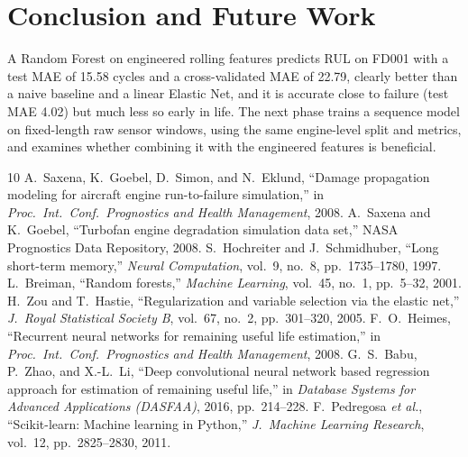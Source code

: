 \documentclass[conference]{IEEEtran}
\begin{document}
\section{Conclusion and Future Work}
A Random Forest on engineered rolling features predicts RUL on FD001 with a test MAE of 15.58 cycles and a cross-validated MAE of 22.79, clearly better than a naive baseline and a linear Elastic Net, and it is accurate close to failure (test MAE 4.02) but much less so early in life. The next phase trains a sequence model on fixed-length raw sensor windows, using the same engine-level split and metrics, and examines whether combining it with the engineered features is beneficial.

\begin{thebibliography}{10}
 A.~Saxena, K.~Goebel, D.~Simon, and N.~Eklund, ``Damage propagation modeling for aircraft engine run-to-failure simulation,'' in \emph{Proc.\ Int.\ Conf.\ Prognostics and Health Management}, 2008.
 A.~Saxena and K.~Goebel, ``Turbofan engine degradation simulation data set,'' NASA Prognostics Data Repository, 2008.
 S.~Hochreiter and J.~Schmidhuber, ``Long short-term memory,'' \emph{Neural Computation}, vol.~9, no.~8, pp.~1735--1780, 1997.
 L.~Breiman, ``Random forests,'' \emph{Machine Learning}, vol.~45, no.~1, pp.~5--32, 2001.
 H.~Zou and T.~Hastie, ``Regularization and variable selection via the elastic net,'' \emph{J.\ Royal Statistical Society B}, vol.~67, no.~2, pp.~301--320, 2005.
 F.~O.~Heimes, ``Recurrent neural networks for remaining useful life estimation,'' in \emph{Proc.\ Int.\ Conf.\ Prognostics and Health Management}, 2008.
 G.~S.~Babu, P.~Zhao, and X.-L.~Li, ``Deep convolutional neural network based regression approach for estimation of remaining useful life,'' in \emph{Database Systems for Advanced Applications (DASFAA)}, 2016, pp.~214--228.
 F.~Pedregosa \emph{et al.}, ``Scikit-learn: Machine learning in Python,'' \emph{J.\ Machine Learning Research}, vol.~12, pp.~2825--2830, 2011.
\end{thebibliography}
\end{document}
